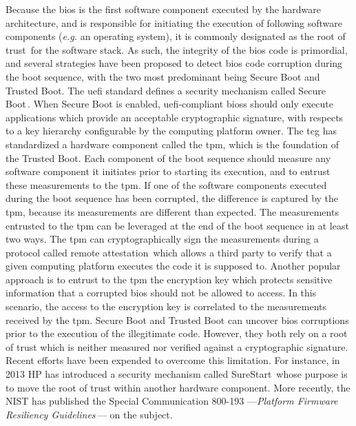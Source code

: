 Because the \ac{bios} is the first software component executed by the hardware
architecture, and is responsible for initiating the execution of following
software components (\emph{e.g.} an operating system), it is commonly designated
as the root of trust\,\cite{rutkowska2015intel} for the software stack.
%
As such, the integrity of the \ac{bios} code is primordial, and several
strategies have been proposed to detect \ac{bios} code corruption during the
boot sequence, with the two most predominant being Secure Boot and Trusted Boot.
%
The \ac{uefi} standard defines a security mechanism called Secure
Boot\,\cite{rosenbaum2012secboot}.
%
When Secure Boot is enabled, \ac{uefi}-compliant \acp{bios} should only execute
applications which provide an acceptable cryptographic signature, with respects
to a key hierarchy configurable by the computing platform owner.
%
The \ac{tcg} has standardized a hardware component called the \ac{tpm}, which is
the foundation of the Trusted Boot.
%
Each component of the boot sequence should measure any software
component it initiates prior to starting its execution, and to entrust these
measurements to the \ac{tpm}.
%
If one of the software components executed during the boot sequence has been
corrupted, the difference is captured by the \ac{tpm}, because its measurements
are different than expected.
%
The measurements entrusted to the \ac{tpm} can be leveraged at the end of the
boot sequence in at least two ways.
%
The \ac{tpm} can cryptographically sign the measurements during a protocol
called remote attestation\,\cite{coker2011remoteattestation} which allows a
third party to verify that a given computing platform executes the code it is
supposed to.
%
Another popular approach is to entrust to the \ac{tpm} the encryption key which
protects sensitive information that a corrupted \ac{bios} should not be allowed to
access.
%
In this scenario, the access to the encryption key is correlated to the
measurements received by the \ac{tpm}.
%
Secure Boot and Trusted Boot can uncover \ac{bios} corruptions prior to the
execution of the illegitimate code.
%
However, they both rely on a root of trust which is neither measured nor
verified against a cryptographic signature.
%
Recent efforts have been expended to overcome this limitation.
%
For instance, in 2013 HP has introduced a security mechanism called
SureStart\,\cite{hp2016surestart} whose purpose is to move the root of trust
within another hardware component.
%
More recently, the NIST has published the Special Communication 800-193
---\emph{Platform Firmware Resiliency
  Guidelines}\,\cite{regenscheid2018nist800193}--- on the subject.

